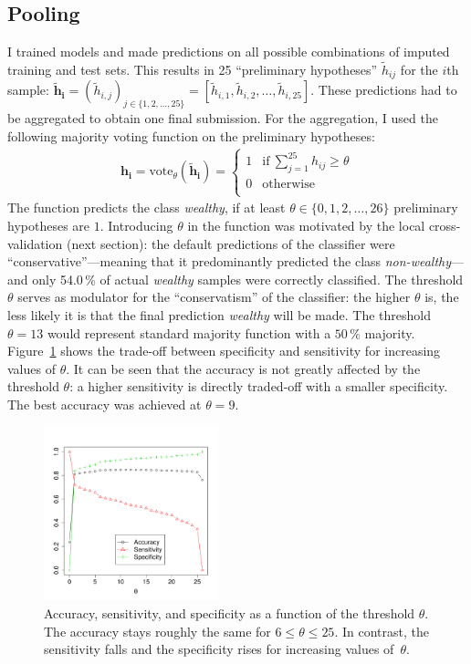 \documentclass[a4paper,11pt]{article}
\begin{document}
\subsection{Pooling}
\label{sec:pooling}

I trained models and made predictions on all possible combinations of
imputed training and test sets. This results in 25 ``preliminary
hypotheses'' $\tilde{h}_{ij}$ for the $i$th sample:
$\mathbf{\tilde{h}_i} = (\tilde{h}_{i,j})_{j \in \{1, 2, \ldots, 25\}}
= [\tilde{h}_{i,1}, \tilde{h}_{i,2}, \ldots, \tilde{h}_{i,25}]$. These
predictions had to be aggregated to obtain one final submission. For
the aggregation, I used the following majority voting function on the
preliminary hypotheses:
\begin{align}
\mathbf{h_i} = \text{vote}_\theta(\mathbf{\tilde{h}_i}) =
\begin{cases}
1 & \text{if}~\sum_{j = 1}^{25} h_{ij} \geq \theta\\
0 & \text{otherwise }\\
\end{cases}
\end{align}
The function predicts the class \emph{wealthy}, if at least
$\theta \in \{0, 1, 2, \ldots, 26\}$ preliminary hypotheses are
$1$. Introducing $\theta$ in the function was motivated by the local
cross-validation (next section): the default predictions of the
classifier were ``conservative''---meaning that it predominantly
predicted the class \emph{non-wealthy}---and only 54.0\,\% of actual
\emph{wealthy} samples were correctly classified. The threshold
$\theta$ serves as modulator for the ``conservatism'' of the
classifier: the higher $\theta$ is, the less likely it is that the
final prediction \emph{wealthy} will be made. The threshold
$\theta = 13$ would represent standard majority function with a
$50\,\%$ majority.  Figure~\ref{fig:tuning} shows the trade-off
between specificity and sensitivity for increasing values of
$\theta$. It can be seen that the accuracy is not greatly affected by
the threshold $\theta$: a higher sensitivity is directly traded-off
with a smaller specificity. The best accuracy was achieved at
$\theta = 9$.

\begin{figure}[h]
  \centering
  \includegraphics[width=0.45\textwidth]{../Python/theta}
  \caption{Accuracy, sensitivity, and specificity as a function of the
    threshold $\theta$. The accuracy stays roughly the same for
    $6 \leq \theta \leq 25$. In contrast, the sensitivity falls and
    the specificity rises for increasing values of~$\theta$.}
  \label{fig:tuning}
\end{figure}
\end{document}
